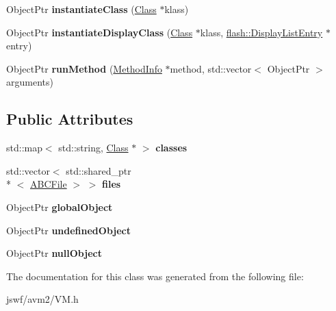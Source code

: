 \begin{DoxyCompactItemize}
\item 
\hypertarget{classjswf_1_1avm2_1_1_v_m_a6fc45596e4e111e16cb2dbd6b5f597dd}{Object\+Ptr {\bfseries instantiate\+Class} (\hyperlink{classjswf_1_1avm2_1_1_class}{Class} $\ast$klass)}\label{classjswf_1_1avm2_1_1_v_m_a6fc45596e4e111e16cb2dbd6b5f597dd}

\item 
\hypertarget{classjswf_1_1avm2_1_1_v_m_a14483ca6a9e3aba0f2cd8d66a55f5dab}{Object\+Ptr {\bfseries instantiate\+Display\+Class} (\hyperlink{classjswf_1_1avm2_1_1_class}{Class} $\ast$klass, \hyperlink{structjswf_1_1flash_1_1_display_list_entry}{flash\+::\+Display\+List\+Entry} $\ast$entry)}\label{classjswf_1_1avm2_1_1_v_m_a14483ca6a9e3aba0f2cd8d66a55f5dab}

\item 
\hypertarget{classjswf_1_1avm2_1_1_v_m_a1caf85605fab2da3f01f37ac9947dc7f}{Object\+Ptr {\bfseries run\+Method} (\hyperlink{structjswf_1_1avm2_1_1_method_info}{Method\+Info} $\ast$method, std\+::vector$<$ Object\+Ptr $>$ arguments)}\label{classjswf_1_1avm2_1_1_v_m_a1caf85605fab2da3f01f37ac9947dc7f}

\end{DoxyCompactItemize}
\subsection*{Public Attributes}
\begin{DoxyCompactItemize}
\item 
\hypertarget{classjswf_1_1avm2_1_1_v_m_a4d766cfab4b97206c17b7a7c8d01dd94}{std\+::map$<$ std\+::string, \hyperlink{classjswf_1_1avm2_1_1_class}{Class} $\ast$ $>$ {\bfseries classes}}\label{classjswf_1_1avm2_1_1_v_m_a4d766cfab4b97206c17b7a7c8d01dd94}

\item 
\hypertarget{classjswf_1_1avm2_1_1_v_m_a2e8e89db4d6c360d99f35e1a84c4b59f}{std\+::vector$<$ std\+::shared\+\_\+ptr\\*
$<$ \hyperlink{classjswf_1_1avm2_1_1_a_b_c_file}{A\+B\+C\+File} $>$ $>$ {\bfseries files}}\label{classjswf_1_1avm2_1_1_v_m_a2e8e89db4d6c360d99f35e1a84c4b59f}

\item 
\hypertarget{classjswf_1_1avm2_1_1_v_m_a8cbe0ed22a150eabf4aa710e5777e1a8}{Object\+Ptr {\bfseries global\+Object}}\label{classjswf_1_1avm2_1_1_v_m_a8cbe0ed22a150eabf4aa710e5777e1a8}

\item 
\hypertarget{classjswf_1_1avm2_1_1_v_m_a68e299adecf896f88df515cbcc839c79}{Object\+Ptr {\bfseries undefined\+Object}}\label{classjswf_1_1avm2_1_1_v_m_a68e299adecf896f88df515cbcc839c79}

\item 
\hypertarget{classjswf_1_1avm2_1_1_v_m_a2120c76dd72c4778b74b0ad09318455d}{Object\+Ptr {\bfseries null\+Object}}\label{classjswf_1_1avm2_1_1_v_m_a2120c76dd72c4778b74b0ad09318455d}

\end{DoxyCompactItemize}


The documentation for this class was generated from the following file\+:\begin{DoxyCompactItemize}
\item 
jswf/avm2/V\+M.\+h\end{DoxyCompactItemize}
